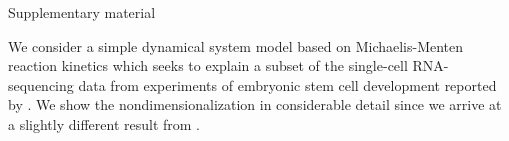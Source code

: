\documentclass[10pt,letterpaper]{article}
\begin{document}
\vspace*{0.2in}

\begin{center}\begin{Large}\begin{bf}
Supplementary material
\end{bf}\end{Large}\end{center}








\bigskip
{}

We consider a simple dynamical system model based on Michaelis-Menten reaction kinetics \cite{tu2019single} which seeks to explain a subset of the single-cell RNA-sequencing data from experiments of embryonic stem cell development reported by \cite{chu2016single}. We show the nondimensionalization in considerable detail since we arrive at a slightly different result from \cite{tu2019single}.

\bigskip
{}
\end{document}
